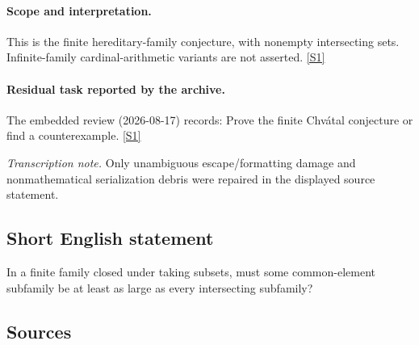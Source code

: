 \documentclass[11pt,a4paper]{article}
\newcommand{\sref}[2]{\hyperlink{source:#1:#2}{[S#2]}}
\begin{document}
\paragraph{Scope and interpretation.}

This is the finite hereditary-family conjecture, with nonempty intersecting sets. Infinite-family cardinal-arithmetic variants are not asserted. \sref{2267}{1}

\paragraph{Residual task reported by the archive.}

The embedded review (2026-08-17) records: Prove the finite Chvátal conjecture or find a counterexample. \sref{2267}{1}

{\small\emph{Transcription note.} Only unambiguous escape/formatting damage and nonmathematical serialization debris were repaired in the displayed source statement.}

\subsection{Short English statement}

In a finite family closed under taking subsets, must some common-element subfamily be at least as large as every intersecting subfamily?

\subsection{Sources}
\end{document}
